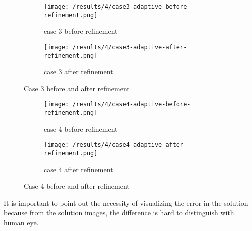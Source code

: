 \begin{figure}[h]
	\centering
    \begin{subfigure}[b]{0.49\textwidth}
	    \texttt{[image: /results/4/case3-adaptive-before-refinement.png]}
		\centering
        \caption{case 3 before refinement}
        \label{fig:AdaptiveCase3Before}
    \end{subfigure} 
    \begin{subfigure}[b]{0.49\textwidth}    
	    \texttt{[image: /results/4/case3-adaptive-after-refinement.png]}
		\centering    
	 \caption{case 3 after refinement}
       \label{fig:AdaptiveCase3After}
    \end{subfigure} 
    \caption{Case 3 before and after refinement}
    \label{fig:AdaptiveCase3}
\end{figure}

\begin{figure}[h]
	\centering
    \begin{subfigure}[b]{0.49\textwidth}
	    \texttt{[image: /results/4/case4-adaptive-before-refinement.png]}
		\centering
        \caption{case 4 before refinement}
        \label{fig:AdaptiveCase4Before}
    \end{subfigure} 
    \begin{subfigure}[b]{0.49\textwidth}    
	    \texttt{[image: /results/4/case4-adaptive-after-refinement.png]}
		\centering    
	 \caption{case 4 after refinement}
       \label{fig:AdaptiveCase4After}
    \end{subfigure} 
    \caption{Case 4 before and after refinement}
    \label{fig:AdaptiveCase4}
\end{figure}


It is important to point out the necessity of visualizing the error in the solution because from the solution images, the difference is hard to distinguish with human eye.

